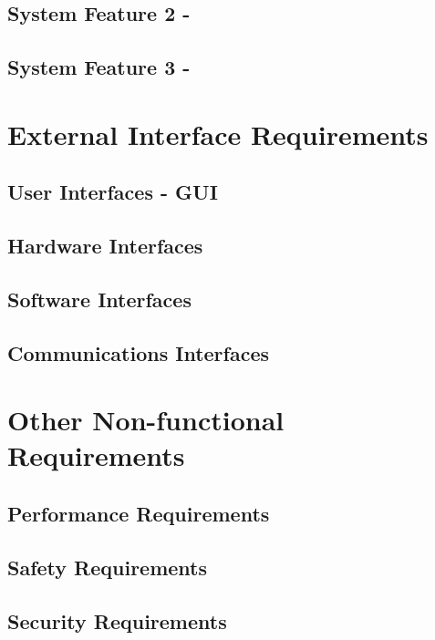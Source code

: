 \documentclass[10pt, a4paper, onecolumn]{scrartcl}
\begin{document}
			
			
			
		
		\subsection{System Feature 2 - }
		
		\subsection{System Feature 3 - }
	
	\section{External Interface Requirements}
	
		\subsection{User Interfaces - GUI}
		
		\subsection{Hardware Interfaces}
		
		\subsection{Software Interfaces}
		
		\subsection{Communications Interfaces}
	
	\section{Other Non-functional Requirements}
	
		\subsection{Performance Requirements}
		
		\subsection{Safety Requirements}
		
		\subsection{Security Requirements}
		
\end{document}
